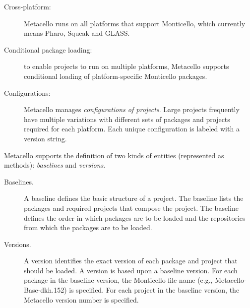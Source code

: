 \documentclass[a4paper,10pt,twoside]{book}
\begin{document}
\begin{description}
\item[Cross-platform:] Metacello  runs on all platforms that support Monticello, which currently means Pharo, Squeak and GLASS.

\item[Conditional package loading:] to enable projects to run on multiple platforms, Metacello supports conditional loading of platform-specific Monticello packages.

\item[Configurations:] Metacello manages \emph{configurations of projects}.  Large projects frequently have multiple variations with different sets of packages and projects required for each platform.  Each unique configuration is labeled with a version string.



\end{description}



Metacello supports the definition of two kinds of entities (represented as methods): \emph{baselines} and \emph{versions}.

\begin{description}
\item[Baselines.] A baseline defines the basic structure of a project. The baseline lists the packages and required projects that compose the project. The baseline defines the order in which packages are to be loaded and the repositories from which the packages are to be loaded.

\item[Versions.] A version identifies the exact version of each package and project that should be loaded. A version is based upon a baseline version. For each package in the baseline version, the Monticello file name (e.g., Metacello-Base-dkh.152) is specified. For each project in the baseline version, the Metacello version number is specified.

\end{description}
\end{document}
